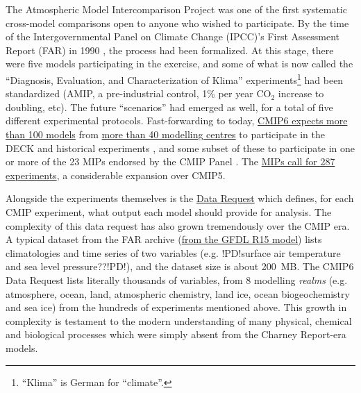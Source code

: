 \documentclass[gmd,manuscript]{copernicus}
\begin{document}
The Atmospheric Model Intercomparison Project
\citep[AMIP:][]{ref:gates1992} was one of the first systematic
cross-model comparisons open to anyone who wished to participate.
By the time of the Intergovernmental Panel on Climate Change (IPCC)'s
First Assessment Report (FAR) in 1990 \citep{ref:houghtonetal1992},
the process had been formalized. At this stage, there were
five models participating in the exercise, and some of what
is now called the ``Diagnosis, Evaluation, and Characterization of
Klima'' \citep[DECK, see][]{ref:eyringetal2016a}
experiments\footnote{``Klima'' is German for ``climate''.} had been
standardized (AMIP, a pre-industrial control, 1\% per year CO$_2$
increase to doubling, etc). The future ``scenarios'' had emerged as well, for
a total of
five different experimental protocols. Fast-forwarding to today,
\hyperlink{https://rawgit.com/WCRP-CMIP/CMIP6_CVs/master/src/CMIP6_source_id.html}{CMIP6
expects more than 100 models} from
\hyperlink{https://rawgit.com/WCRP-CMIP/CMIP6_CVs/master/src/CMIP6_institution_id.html}{more than 40 modelling centres}
\citep[in 27 countries, a stark contrast to the US monopoly
in][]{ref:charneyetal1979} to participate in the DECK and historical
experiments \citep[Table~2 of][]{ref:eyringetal2016a}, and some subset
of these to participate in one or more of the 23 MIPs endorsed by the
CMIP Panel \citep[Table~3 of][, originally 21 with two new MIPs
more recently endorsed]{ref:eyringetal2016a}.
The
\hyperlink{https://rawgit.com/WCRP-CMIP/CMIP6_CVs/master/src/CMIP6_experiment_id.html}{MIPs call for 287 experiments},
a considerable expansion over CMIP5.

Alongside the experiments themselves is the
\hyperlink{http://clipc-services.ceda.ac.uk/dreq/index.html}{Data Request}
which defines, for each CMIP experiment, what output each model should
provide for analysis. The complexity of this data request has also
grown tremendously over the CMIP era. A typical dataset from the FAR
archive
(\hyperlink{https://cera-www.dkrz.de/WDCC/ui/cerasearch/entry?acronym=IPCC_DDC_FAR_GFDL_R15TRCT_D}{from the GFDL R15 model})
lists climatologies and time series of two variables (e.g. !PD!surface air temperature and
sea level pressure??!PD!), and the dataset size
is about 200~MB. The CMIP6 Data Request \cite{ref:juckesetal2015}
lists literally thousands of variables, from 8 modelling \emph{realms} (e.g. atmosphere,
ocean, land, atmospheric chemistry, land ice, ocean biogeochemistry and sea ice)
from the hundreds of experiments mentioned above. This growth in complexity
is testament to the modern understanding of many physical, chemical and biological
processes which were simply absent from the Charney Report-era models.
\end{document}
